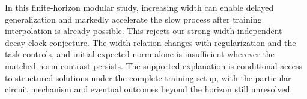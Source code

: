In this finite-horizon modular study, increasing width can enable delayed generalization and markedly accelerate the slow process after training interpolation is already possible. This rejects our strong width-independent decay-clock conjecture. The width relation changes with regularization and the task controls, and initial expected norm alone is insufficient wherever the matched-norm contrast persists. The supported explanation is conditional access to structured solutions under the complete training setup, with the particular circuit mechanism and eventual outcomes beyond the horizon still unresolved.
